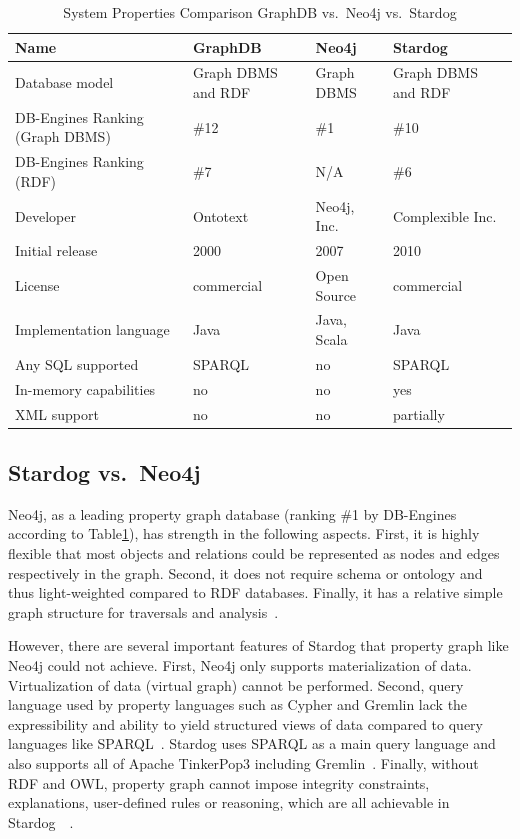 \begin{table}[htb]
	\centering
	\caption{System Properties Comparison GraphDB vs.\ Neo4j vs.\ 
	Stardog}\label{t:comparison}
	\begin{tabular}{llll}
	Name & GraphDB & Neo4j & Stardog \\
		\toprule
	Database model&	Graph DBMS and RDF & Graph DBMS & Graph DBMS and 
	RDF \\
	\midrule
	DB-Engines Ranking (Graph DBMS) &\#12 &\#1 &\#10\\
	\midrule
	DB-Engines Ranking (RDF) &\#7 &N/A &\#6\\
	\midrule
	Developer & Ontotext &	Neo4j, Inc.	& Complexible Inc.\\
	\midrule
	Initial release	&2000 &	2007&	2010\\
	\midrule
	License &	commercial &	Open Source &	commercial \\
	\midrule
	Implementation language &	Java &	Java, Scala &	Java\\
	\midrule
	Any SQL supported &	SPARQL &	no	& SPARQL \\
	\midrule
	In-memory capabilities&no &no &			yes\\
	\midrule
	XML support&	no	& no& 	partially\\
	\bottomrule
	\end{tabular}
\end{table}

\subsection{Stardog vs.\ Neo4j}
Neo4j, as a leading property graph database (ranking \#1 by DB-Engines 
according to Table\ref{t:comparison}), has strength in the following aspects. 
First, it is highly flexible that most objects and relations could be represented 
as nodes and edges respectively in the graph. Second, it does not require 
schema or ontology and thus light-weighted compared to RDF databases. 
Finally, it has a relative simple graph structure for traversals and 
analysis~\cite{hid-sp18-405-robinson2013graphdatabase-stardog}. 

However, there are several important features of Stardog that property graph 
like Neo4j could not achieve. First, Neo4j only supports materialization of 
data. Virtualization of data (virtual graph) cannot be performed. Second, 
query language used by property languages such as Cypher and Gremlin lack 
the expressibility and ability to yield structured views of data compared to 
query languages like SPARQL~\cite{hid-sp18-405-angles2008expre-stardog}. 
Stardog uses SPARQL as a main query language and also supports all of 
Apache TinkerPop3 including 
Gremlin~\cite{hid-sp18-405-www-stardog-docs}. Finally, without RDF and 
OWL, property graph cannot impose integrity constraints, explanations, 
user-defined rules or reasoning, which are all achievable in 
Stardog~\cite{hid-sp18-405-www-stardog-dbengines-neo4j}~\cite{hid-sp18-405-www-stardog-docs}.
 
